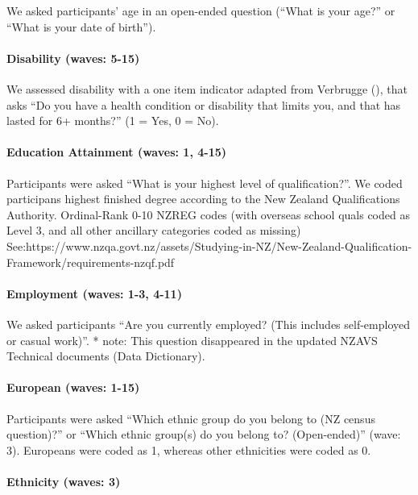 \documentclass[
  singlecolumn]{article}
\let\oldparagraph\paragraph
\renewcommand{\paragraph}[1]{\oldparagraph{#1}\mbox{}}
\begin{document}
We asked participants' age in an open-ended question (``What is your
age?'' or ``What is your date of birth'').

\paragraph{Disability (waves: 5-15)}\label{disability-waves-5-15}

We assessed disability with a one item indicator adapted from Verbrugge
(), that asks ``Do you have a health
condition or disability that limits you, and that has lasted for 6+
months?'' (1 = Yes, 0 = No).

\paragraph{Education Attainment (waves: 1,
4-15)}\label{education-attainment-waves-1-4-15}

Participants were asked ``What is your highest level of
qualification?''. We coded participans highest finished degree according
to the New Zealand Qualifications Authority. Ordinal-Rank 0-10 NZREG
codes (with overseas school quals coded as Level 3, and all other
ancillary categories coded as missing)
See:https://www.nzqa.govt.nz/assets/Studying-in-NZ/New-Zealand-Qualification-Framework/requirements-nzqf.pdf

\paragraph{Employment (waves: 1-3,
4-11)}\label{employment-waves-1-3-4-11}

We asked participants ``Are you currently employed? (This includes
self-employed or casual work)''. * note: This question disappeared in
the updated NZAVS Technical documents (Data Dictionary).

\paragraph{European (waves: 1-15)}\label{european-waves-1-15}

Participants were asked ``Which ethnic group do you belong to (NZ census
question)?'' or ``Which ethnic group(s) do you belong to? (Open-ended)''
(wave: 3). Europeans were coded as 1, whereas other ethnicities were
coded as 0.

\paragraph{Ethnicity (waves: 3)}\label{ethnicity-waves-3}
\end{document}
